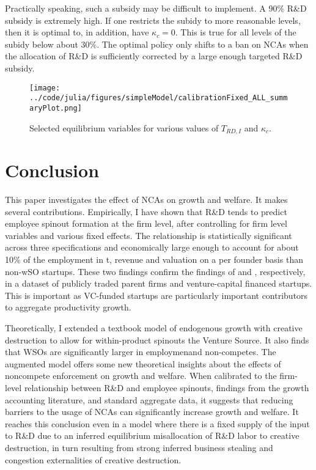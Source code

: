 \documentclass[11pt,english]{article}
\begin{document}
Practically speaking, such a subsidy may be difficult to implement. A 90\% R\&D subsidy is extremely high. If one restricts the subidy to more reasonable levels, then it is optimal to, in addition, have $\kappa_c = 0$. This is true for all levels of the subidy below about 30\%. The optimal policy only shifts to a ban on NCAs when the allocation of R\&D is sufficiently corrected by a large enough targeted R\&D subsidy. 

\begin{figure}[]
	\texttt{[image: ../code/julia/figures/simpleModel/calibrationFixed\_ALL\_summaryPlot.png]}
	\caption{Selected equilibrium variables for various values of $T_{RD,I}$ and $\kappa_c$.}
	\label{calibration_ALL_summaryPlot}
\end{figure}

\section{Conclusion}
 
This paper investigates the effect of NCAs on growth and welfare. It makes several contributions. Empirically, I have shown that R\&D tends to predict employee spinout formation at the firm level, after controlling for firm level variables and various fixed effects. The relationship is statistically significant across three specifications and economically large enough to account for about 10\% of the employment in t, revenue and valuation on a per founder basis than non-wSO startups. These two findings confirm the findings of \cite{babina_entrepreneurial_2019} and \cite{muendler_employee_2012}, respectively, in a dataset of publicly traded parent firms and venture-capital financed startups. This is important as VC-funded startups are particularly important contributors to aggregate productivity growth. 

Theoretically, I extended a textbook model of endogenous growth with creative destruction to allow for within-product spinouts the Venture Source. It also finds that WSOs are significantly larger in employmenand non-competes. The augmented model offers some new theoretical insights about the effects of noncompete enforcement on growth and welfare. When calibrated to the firm-level relationship between R\&D and employee spinouts, findings from the growth accounting literature, and standard aggregate data, it suggests that reducing barriers to the usage of NCAs can significantly increase growth and welfare. It reaches this conclusion even in a model where there is a fixed supply of the input to R\&D due to an inferred equilibrium misallocation of R\&D labor to creative destruction, in turn resulting from strong inferred business stealing and congestion externalities of creative destruction.
\end{document}

